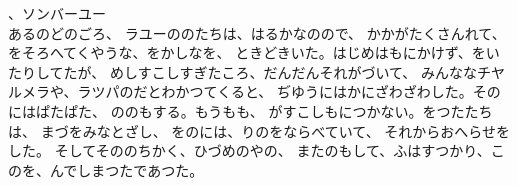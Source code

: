 \documentclass[
a4paper,
fontsize=20pt,
jafontsize=20pt,
book]
{tarticle}
\begin{document}
{、ソンバーユー\\

あるのどのごろ、
ラユーののたちは、はるかなのので、
かかがたくさんれて、をそろへてくやうな、をかしなを、
ときどきいた。はじめはもにかけず、をいたりしてたが、
めしすこしすぎたころ、だんだんそれがづいて、
みんななチヤルメラや、ラツパのだとわかつてくると、
ぢゆうにはかにざわざわした。そのにはぱたぱた、
ののもする。もうもも、
がすこしもにつかない。をつたたちは、
まづをみなとざし、
をのには、りのをならべていて、
それからおへらせをした。
そしてそののちかく、ひづめのやの、
またのもして、ふはすつかり、このを、んでしまつたであつた。
}\begin{comment}
  \ruby[g]{番兵}{ばんへい}たちや、あらゆる\ruby{町}{まち}の\ruby[g]{人}{ひと}たちが、まるでどきどきやりながら、\ruby[g]{矢}{や}を\ruby[g]{射}{い}る\ruby[g]{孔}{あな}からのぞいて\ruby[g]{見}{み}た。\ruby{壁}{かべ}の\ruby[g]{外}{そと}から\ruby[g]{北}{きた}の\ruby{方}{ほう}、まるで\ruby[g]{雲霞}{うんか}の\ruby[g]{軍勢}{ぐんぜい}だ。ひらひらひかる\ruby[g]{三角旗}{さんかくばた}や、ほこがさながら\ruby[g]{林}{はやし}のやうだ。ことになんとも\ruby[g]{奇体}{きたい}なことは、\ruby{兵隊}{へい|たい}たちが、みな\ruby[g]{灰}{はい}いろでぼさぼさして、なんだかけむりのやうなのだ。するどい\ruby[g]{眼}{め}をして、ひげが\ruby[g]{二}{ふた}いろまつ\ruby[g]{白}{しろ}な、せなかのまがつた\ruby[g]{大将}{たいしょう}が、\ruby[g]{尻尾}{しつぽ}が\ruby[g]{箒}{はうき}のかたちになつて、うしろにぴんとのびて\ruby{ゐ}{い}る\ruby[g]{白馬}{はくば}に\ruby[g]{乗}{の}つて\ruby[g]{先頭}{せんとう}に\ruby[g]{立}{た}ち、\ruby[g]{大}{おお}きな\ruby[g]{剣}{けん}を\ruby[g]{空}{そら}にあげ、\ruby{声}{こえ}\ruby[g]{高々}{たかだか}と\ruby[g]{歌}{うた}つて\ruby{ゐ}{い}る。


\end{comment}
\end{document}
